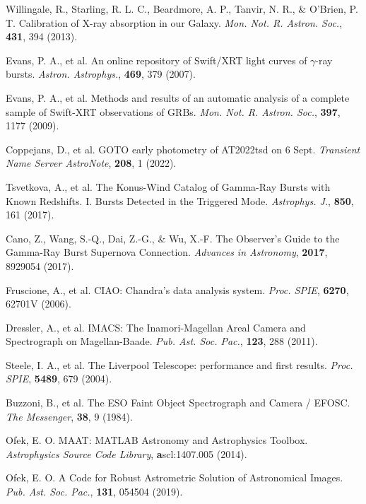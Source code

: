 \documentclass{nature_plusfigure}
\newcommand{\mn}{{Mon. Not. R. Astron. Soc.}}
\newcommand{\mnras}{\mn}
\newcommand{\apj}{{Astrophys. J.}}
\newcommand{\aap}{{Astron. Astrophys.}}
\newcommand{\pasp}{{Pub. Ast. Soc. Pac.}}
\newcommand{\procspie}{Proc. SPIE}
\begin{document}
\begin{methods}
\begin{thebibliography}{10}
 Willingale, R., Starling, R. L. C., Beardmore, A. P., Tanvir, N. R., \& O'Brien, P. T. Calibration of X-ray absorption in our Galaxy. \emph{\mnras}, \textbf{431}, 394 (2013). 

 Evans, P. A., et al. An online repository of Swift/XRT light curves of $\gamma$-ray bursts. \emph{\aap}, \textbf{469}, 379 (2007). 

 Evans, P. A., et al. Methods and results of an automatic analysis of a complete sample of Swift-XRT observations of GRBs. \emph{\mnras}, \textbf{397}, 1177 (2009). 

 Coppejans, D., et al. GOTO early photometry of AT2022tsd on 6 Sept. \emph{Transient Name Server AstroNote}, \textbf{208}, 1 (2022). 

 Tsvetkova, A., et al. The Konus-Wind Catalog of Gamma-Ray Bursts with Known Redshifts. I. Bursts Detected in the Triggered Mode. \emph{\apj}, \textbf{850}, 161 (2017). 

 Cano, Z., Wang, S.-Q., Dai, Z.-G., \& Wu, X.-F. The Observer's Guide to the Gamma-Ray Burst Supernova Connection. \emph{Advances in Astronomy}, \textbf{2017}, 8929054 (2017). 

 Fruscione, A., et al. CIAO: Chandra's data analysis system. \emph{\procspie}, \textbf{6270}, 62701V (2006). 

 Dressler, A., et al. IMACS: The Inamori-Magellan Areal Camera and Spectrograph on Magellan-Baade. \emph{\pasp}, \textbf{123}, 288 (2011). 


 Steele, I. A., et al. The Liverpool Telescope: performance and first results. \emph{\procspie}, \textbf{5489}, 679 (2004). 

 Buzzoni, B., et al. The ESO Faint Object Spectrograph and Camera / EFOSC. \emph{The Messenger}, \textbf{38}, 9 (1984). 

 Ofek, E. O. MAAT: MATLAB Astronomy and Astrophysics Toolbox. \emph{Astrophysics Source Code Library}, \textbf ascl:1407.005 (2014). 

 Ofek, E. O. A Code for Robust Astrometric Solution of Astronomical Images. \emph{\pasp}, \textbf{131}, 054504 (2019). 


\end{thebibliography}
\end{methods}
\end{document}
